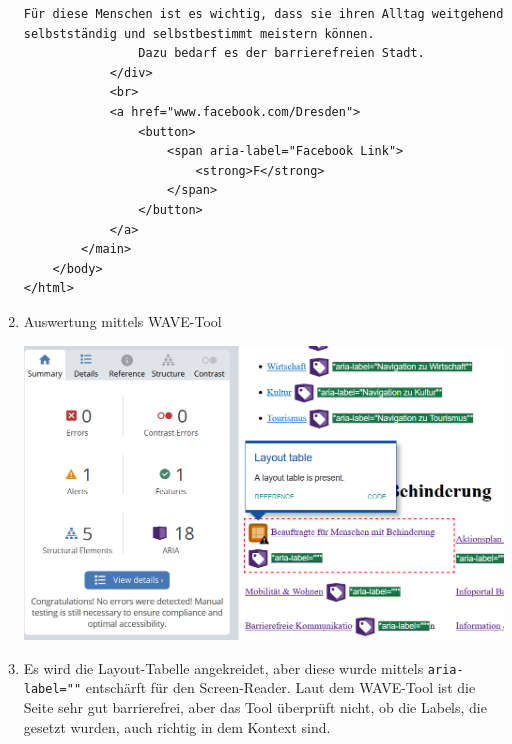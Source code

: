 \documentclass{article}
\begin{document}
\begin{enumerate}[label=(\alph*)]
\begin{lstlisting}[style=html,tabsize=2]
				Für diese Menschen ist es wichtig, dass sie ihren Alltag weitgehend selbstständig und selbstbestimmt meistern können. 
				Dazu bedarf es der barrierefreien Stadt.
			</div>
			<br>
			<a href="www.facebook.com/Dresden">
				<button>
					<span aria-label="Facebook Link">
						<strong>F</strong>
					</span>  
				</button>
			</a>
		</main>
	</body>
</html>
		\end{lstlisting}
		\item Auswertung mittels WAVE-Tool
		\begin{center}
			\includegraphics[scale=0.4]{image001.png}
		\end{center}
		\item Es wird die Layout-Tabelle angekreidet, aber diese wurde mittels \texttt{aria-label=""} entschärft für den Screen-Reader. Laut dem WAVE-Tool ist die Seite sehr gut barrierefrei, aber das Tool überprüft nicht, ob die Labels, die gesetzt wurden, auch richtig in dem Kontext sind.
	\end{enumerate}
	
\end{document}

